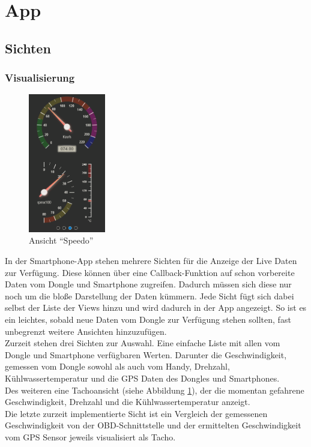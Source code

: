 \section{App}

\subsection{Sichten}

\subsubsection{Visualisierung}
\label{sec:appSichtAnzeige}

\begin{figure}
  \begin{center}
	\includegraphics[width=0.3\textwidth]{./img/App_Speedo}
	\caption{Ansicht \enquote{Speedo}}
	\label{fig:App_Speedo}
  \end{center}
\end{figure}

In der Smartphone-App stehen mehrere Sichten für die Anzeige der Live Daten zur Verfügung. Diese können über eine Callback-Funktion auf schon vorbereite Daten vom Dongle und Smartphone zugreifen. Dadurch müssen sich diese nur noch um die bloße Darstellung der Daten kümmern. Jede Sicht fügt sich dabei selbst der Liste der Views hinzu und wird dadurch in der App angezeigt. So ist es ein leichtes, sobald neue Daten vom Dongle zur Verfügung stehen sollten, fast unbegrenzt weitere Ansichten hinzuzufügen.
\\
Zurzeit stehen drei Sichten zur Auswahl. Eine einfache Liste mit allen vom Dongle und Smartphone verfügbaren Werten. Darunter die Geschwindigkeit, gemessen vom Dongle sowohl als auch vom Handy, Drehzahl, Kühlwassertemperatur und die GPS Daten des Dongles und Smartphones.
\\
Des weiteren eine Tachoansicht (siehe Abbildung \ref{fig:App_Speedo}), der die momentan gefahrene Geschwindigkeit, Drehzahl und die Kühlwassertemperatur anzeigt.
\\ 
Die letzte zurzeit implementierte Sicht ist ein Vergleich der gemessenen Geschwindigkeit von der OBD-Schnittstelle und der ermittelten Geschwindigkeit vom GPS Sensor jeweils visualisiert als Tacho.

